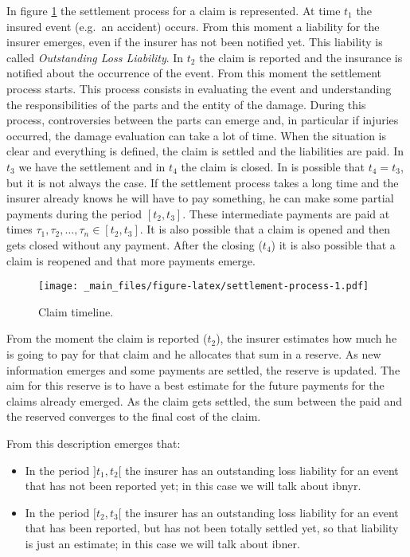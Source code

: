 \documentclass[a4paper, twoside, openright, 12pt]{report}
\providecommand{\tightlist}{%
  \setlength{\itemsep}{0pt}\setlength{\parskip}{0pt}}
\theoremstyle{definition}
\theoremstyle{definition}
\theoremstyle{definition}
\theoremstyle{remark}
\begin{document}
In figure \ref{fig:settlement-process} the settlement process for a claim is represented. At time \(t_1\) the insured event (e.g.~an accident) occurs. From this moment a liability for the insurer emerges, even if the insurer has not been notified yet. This liability is called \emph{Outstanding Loss Liability}. In \(t_2\) the claim is reported and the insurance is notified about the occurrence of the event. From this moment the settlement process starts. This process consists in evaluating the event and understanding the responsibilities of the parts and the entity of the damage. During this process, controversies between the parts can emerge and, in particular if injuries occurred, the damage evaluation can take a lot of time. When the situation is clear and everything is defined, the claim is settled and the liabilities are paid. In \(t_3\) we have the settlement and in \(t_4\) the claim is closed. In is possible that \(t_4=t_3\), but it is not always the case. If the settlement process takes a long time and the insurer already knows he will have to pay something, he can make some partial payments during the period \([t_2, t_3]\). These intermediate payments are paid at times \(\tau_1, \tau_2, \dots, \tau_n \in [t_2, t_3]\). It is also possible that a claim is opened and then gets closed without any payment. After the closing (\(t_4\)) it is also possible that a claim is reopened and that more payments emerge.

\begin{figure}
\centering
\texttt{[image: \_main\_files/figure-latex/settlement-process-1.pdf]}
\caption{\label{fig:settlement-process}Claim timeline.}
\end{figure}

From the moment the claim is reported (\(t_2\)), the insurer estimates how much he is going to pay for that claim and he allocates that sum in a reserve. As new information emerges and some payments are settled, the reserve is updated. The aim for this reserve is to have a best estimate for the future payments for the claims already emerged. As the claim gets settled, the sum between the paid and the reserved converges to the final cost of the claim.

From this description emerges that:

\begin{itemize}
\tightlist
\item
  In the period \(]t_1, t_2[\) the insurer has an outstanding loss liability for an event that has not been reported yet; in this case we will talk about \ac{ibnyr}.
\item
  In the period \([t_2, t_3[\) the insurer has an outstanding loss liability for an event that has been reported, but has not been totally settled yet, so that liability is just an estimate; in this case we will talk about \ac{ibner}.
\end{itemize}
\end{document}
